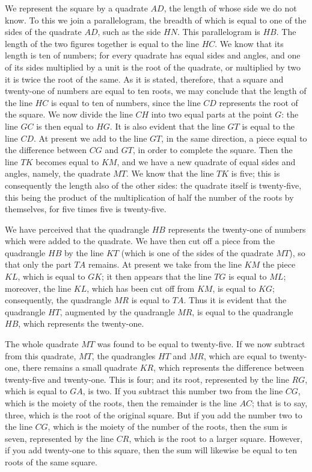 We represent the square by a quadrate $AD$, the length of whose side we do not know. To this we join a parallelogram, the breadth of which is equal to one of the sides of the quadrate $AD$, such as the side $HN$. This parallelogram is $HB$. The length of the two figures together is equal to the line $HC$. We know that its length is ten of numbers; for every quadrate has equal sides and angles, and one of its sides multiplied by a unit is the root of the quadrate, or multiplied by two it is twice the root of the same. As it is stated, therefore, that a square and twenty-one of numbers are equal to ten roots, we may conclude that the length of the line $HC$ is equal to ten of numbers, since the line $CD$ represents the root of the square. We now divide the line $CH$ into two equal parts at the point $G$: the line $GC$ is then equal to $HG$. It is also evident that the line $GT$ is equal to the line $CD$. At present we add to the line $GT$, in the same direction, a piece equal to the difference between $CG$ and $GT$, in order to complete the square. Then the line $TK$ becomes equal to $KM$, and we have a new quadrate of equal sides and angles, namely, the quadrate $MT$. We know that the line $TK$ is five; this is consequently the length also of the other sides: the quadrate itself is twenty-five, this being the product of the multiplication of half the number of the roots by themselves, for five times five is twenty-five.

We have perceived that the quadrangle $HB$ represents the twenty-one of numbers which were added to the quadrate. We have then cut off a piece from the quadrangle $HB$ by the line $KT$ (which is one of the sides of the quadrate $MT$), so that only the part $TA$ remains. At present we take from the line $KM$ the piece $KL$, which is equal to $GK$; it then appears that the line $TG$ is equal to $ML$; moreover, the line $KL$, which has been cut off from $KM$, is equal to $KG$; consequently, the quadrangle $MR$ is equal to $TA$. Thus it is evident that the quadrangle $HT$, augmented by the quadrangle $MR$, is equal to the quadrangle $HB$, which represents the twenty-one.

The whole quadrate $MT$ was found to be equal to twenty-five. If we now subtract from this quadrate, $MT$, the quadrangles $HT$ and $MR$, which are equal to twenty-one, there remains a small quadrate $KR$, which represents the difference between twenty-five and twenty-one. This is four; and its root, represented by the line $RG$, which is equal to $GA$, is two. If you subtract this number two from the line $CG$, which is the moiety of the roots, then the remainder is the line $AC$; that is to say, three, which is the root of the original square. But if you add the number two to the line $CG$, which is the moiety of the number of the roots, then the sum is seven, represented by the line $CR$, which is the root to a larger square. However, if you add twenty-one to this square, then the sum will likewise be equal to ten roots of the same square.

